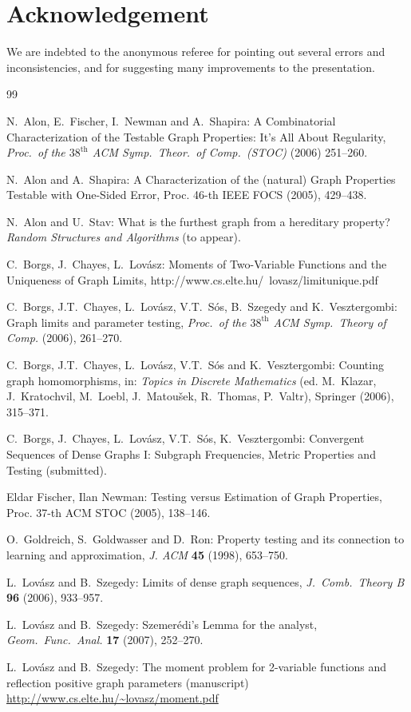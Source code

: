 \documentclass{article}
\begin{document}
\section*{Acknowledgement}

We are indebted to the anonymous referee for pointing out several
errors and inconsistencies, and for suggesting many improvements to
the presentation.

\begin{thebibliography}{99}


N.~Alon, E.~Fischer, I.~Newman and A.~Shapira: A Combinatorial
Characterization of the Testable Graph Properties: It's All About
Regularity, {\it Proc.\ of the $\text{38}^\text{th}$ ACM Symp.\
Theor.\ of Comp.\ (STOC)} (2006) 251--260.

N.~Alon and A.~Shapira: A Characterization of the (natural) Graph
Properties Testable with One-Sided Error, Proc. 46-th IEEE FOCS
(2005), 429--438.

N.~Alon and U.~Stav: What is the furthest graph from a hereditary
property? {\it Random Structures and Algorithms} (to appear).

C.~Borgs, J.~Chayes, L.~Lov\'asz: Moments of Two-Variable Functions
and the Uniqueness of Graph Limits,
http://www.cs.elte.hu/~lovasz/limitunique.pdf

C.~Borgs, J.T.~Chayes, L.~Lov\'asz, V.T.~S\'os, B.~Szegedy and
K.~Vesztergombi: Graph limits and parameter testing, {\it Proc.\ of
the $\text{38}^\text{th}$ ACM Symp.\ Theory of Comp.} (2006),
261--270.

C.~Borgs, J.T.~Chayes, L.~Lov\'asz, V.T.~S\'os and K.~Vesztergombi:
Counting graph homomorphisms, in: {\it Topics in Discrete
Mathematics} (ed. M.~Klazar, J.~Kratochvil, M.~Loebl,
J.~Matou\v{s}ek, R.~Thomas, P.~Valtr), Springer (2006), 315--371.

C.~Borgs, J.~Chayes, L.~Lov\'asz, V.T.~S\'os, K.~Vesztergombi:
Convergent Sequences of Dense Graphs I: Subgraph Frequencies, Metric
Properties and Testing (submitted).

Eldar Fischer, Ilan Newman: Testing versus Estimation of Graph
Properties, Proc. 37-th ACM STOC (2005), 138--146.


O.~Goldreich, S.~Goldwasser and D.~Ron: Property testing and its
connection to learning and approximation, {\it J. ACM} {\bf 45}
(1998), 653--750.

L.~Lov\'asz and B.~Szegedy: Limits of dense graph sequences, {\it
J.~Comb.\ Theory B} {\bf 96}  (2006),  933--957.

L.~Lov\'asz and B.~Szegedy: Szemer\'edi's Lemma for the analyst, {\it
Geom.\ Func.\ Anal.} {\bf 17} (2007), 252--270.

L.~Lov\'asz and B.~Szegedy: The moment problem for 2-variable
functions and reflection positive graph parameters (manuscript)
\url{http://www.cs.elte.hu/~lovasz/moment.pdf}

\end{thebibliography}
\end{document}

